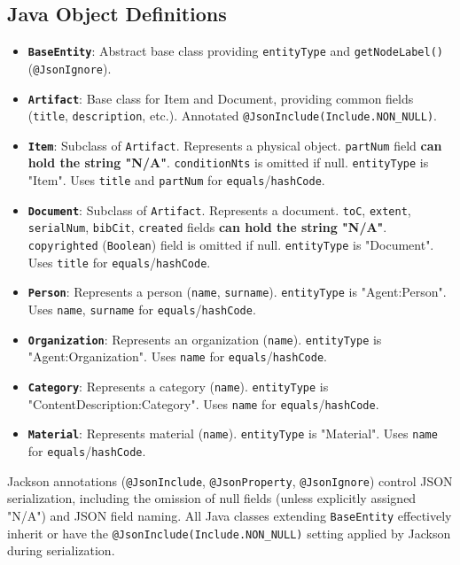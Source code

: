 \documentclass[11pt, a4paper]{article}
\begin{document}
\subsection*{Java Object Definitions}
\begin{itemize}
    \item \textbf{\texttt{BaseEntity}}: Abstract base class providing \texttt{entityType} and \texttt{getNodeLabel()} (\texttt{@JsonIgnore}).
    \item \textbf{\texttt{Artifact}}: Base class for Item and Document, providing common fields (\texttt{title}, \texttt{description}, etc.). Annotated \texttt{@JsonInclude(Include.NON\_NULL)}.
    \item \textbf{\texttt{Item}}: Subclass of \texttt{Artifact}. Represents a physical object. \texttt{partNum} field \textbf{can hold the string "N/A"}. \texttt{conditionNts} is omitted if null. \texttt{entityType} is "Item". Uses \texttt{title} and \texttt{partNum} for \texttt{equals}/\texttt{hashCode}.
    \item \textbf{\texttt{Document}}: Subclass of \texttt{Artifact}. Represents a document. \texttt{toC}, \texttt{extent}, \texttt{serialNum}, \texttt{bibCit}, \texttt{created} fields \textbf{can hold the string "N/A"}. \texttt{copyrighted} (\texttt{Boolean}) field is omitted if null. \texttt{entityType} is "Document". Uses \texttt{title} for \texttt{equals}/\texttt{hashCode}.
    \item \textbf{\texttt{Person}}: Represents a person (\texttt{name}, \texttt{surname}). \texttt{entityType} is "Agent:Person". Uses \texttt{name}, \texttt{surname} for \texttt{equals}/\texttt{hashCode}.
    \item \textbf{\texttt{Organization}}: Represents an organization (\texttt{name}). \texttt{entityType} is "Agent:Organization". Uses \texttt{name} for \texttt{equals}/\texttt{hashCode}.
    \item \textbf{\texttt{Category}}: Represents a category (\texttt{name}). \texttt{entityType} is "ContentDescription:Category". Uses \texttt{name} for \texttt{equals}/\texttt{hashCode}.
    \item \textbf{\texttt{Material}}: Represents material (\texttt{name}). \texttt{entityType} is "Material". Uses \texttt{name} for \texttt{equals}/\texttt{hashCode}.
\end{itemize}
Jackson annotations (\texttt{@JsonInclude}, \texttt{@JsonProperty}, \texttt{@JsonIgnore}) control JSON serialization, including the omission of null fields (unless explicitly assigned "N/A") and JSON field naming. All Java classes extending \texttt{BaseEntity} effectively inherit or have the \texttt{@JsonInclude(Include.NON\_NULL)} setting applied by Jackson during serialization.
\end{document}
